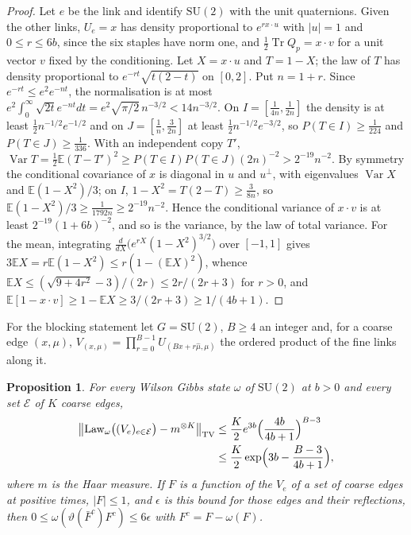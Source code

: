 \documentclass[11pt]{amsart}
\newtheorem{proposition}[theorem]{Proposition}
\theoremstyle{definition}
\theoremstyle{remark}
\numberwithin{equation}{section}
\newcommand{\E}{\mathbb{E}}
\newcommand{\SU}{\mathrm{SU}}
\newcommand{\Tr}{\operatorname{Tr}}
\newcommand{\Var}{\operatorname{Var}}
\begin{document}
\begin{proof}
Let $e$ be the link and identify $\SU(2)$ with the unit quaternions. Given the
other links, $U_e=x$ has density proportional to $e^{rx\cdot u}$ with $|u|=1$
and $0\le r\le6b$, since the six staples have norm one, and $\frac12\Tr Q_p=x\cdot
v$ for a unit vector $v$ fixed by the conditioning. Let $X=x\cdot u$ and
$T=1-X$; the law of $T$ has density proportional to $e^{-rt}\sqrt{t(2-t)}$ on
$[0,2]$. Put $n=1+r$. Since $e^{-rt}\le e^2e^{-nt}$, the normalisation is at
most $e^2\int_0^\infty\sqrt{2t}e^{-nt}dt=e^2\sqrt{\pi/2}\,n^{-3/2}<14n^{-3/2}$.
On $I=[\frac1{4n},\frac1{2n}]$ the density is at least
$\frac12n^{-1/2}e^{-1/2}$ and on $J=[\frac1n,\frac3{2n}]$ at least
$\frac12n^{-1/2}e^{-3/2}$, so $P(T\in I)\ge\frac1{224}$ and
$P(T\in J)\ge\frac1{336}$. With an independent copy $T'$,
$\Var T=\frac12\E(T-T')^2\ge P(T\in I)P(T\in J)(2n)^{-2}>2^{-19}n^{-2}$. By
symmetry the conditional covariance of $x$ is diagonal in $u$ and
$u^\perp$, with eigenvalues $\Var X$ and $\E(1-X^2)/3$; on $I$,
$1-X^2=T(2-T)\ge\frac3{8n}$, so $\E(1-X^2)/3\ge\frac1{1792n}\ge2^{-19}n^{-2}$.
Hence the conditional variance of $x\cdot v$ is at least $2^{-19}(1+6b)^{-2}$,
and so is the variance, by the law of total variance. For the mean, integrating
$\frac d{dX}\bigl(e^{rX}(1-X^2)^{3/2}\bigr)$ over $[-1,1]$ gives
$3\E X=r\E(1-X^2)\le r(1-(\E X)^2)$, whence
$\E X\le(\sqrt{9+4r^2}-3)/(2r)\le2r/(2r+3)$ for $r>0$, and
$\E[1-x\cdot v]\ge1-\E X\ge3/(2r+3)\ge1/(4b+1)$.
\end{proof}

For the blocking statement let $G=\SU(2)$, $B\ge4$ an integer and, for a
coarse edge $(x,\mu)$, $V_{(x,\mu)}=\prod_{r=0}^{B-1}U_{(Bx+r\hat\mu,\mu)}$ the
ordered product of the fine links along it.

\begin{proposition}\label{prop:blocking}
For every Wilson Gibbs state $\omega$ of $\SU(2)$ at $b>0$ and every set $\mathcal
E$ of $K$ coarse edges,
\[
\begin{split}
\bigl\|\mathrm{Law}_\omega\bigl((V_e)_{e\in\mathcal E}\bigr)-m^{\otimes K}\bigr\|_{\mathrm{TV}}
&\le\frac K2e^{3b}\Bigl(\frac{4b}{4b+1}\Bigr)^{B-3}\\
&\le\frac K2\exp\Bigl(3b-\frac{B-3}{4b+1}\Bigr),
\end{split}
\]
where $m$ is the Haar measure. If $F$ is a function of the $V_e$ of a set of
coarse edges at positive times, $|F|\le1$, and $\epsilon$ is this bound for
those edges and their reflections, then
$0\le\omega(\vartheta(\bar F^c)F^c)\le6\epsilon$ with $F^c=F-\omega(F)$.
\end{proposition}
\end{document}
